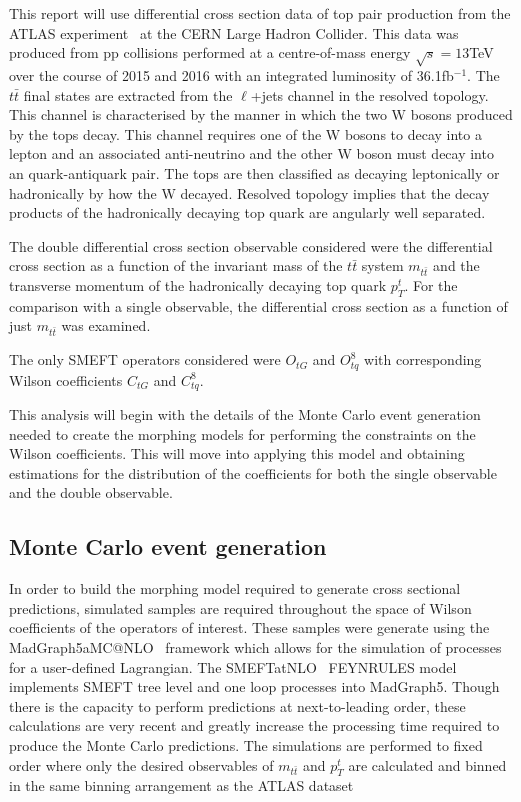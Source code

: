 \documentclass[a4paper]{article}
\begin{document}
This report will use differential cross section data of top pair production from the ATLAS experiment~\cite{ATLAS:2019hxz} at the CERN Large Hadron Collider.
This data was produced from pp collisions performed at a centre-of-mass energy $\sqrt{s} = 13$TeV over the course of 2015 and 2016 with an integrated luminosity of 36.1fb$^{-1}$.
The $t\bar{t}$ final states are extracted from the $\ell$+jets channel in the resolved topology.
This channel is characterised by the manner in which the two W bosons produced by the tops decay.
This channel requires one of the W bosons to decay into a lepton and an associated anti-neutrino and the other W boson must decay into an quark-antiquark pair.
The tops are then classified as decaying leptonically or hadronically by how the W decayed.
Resolved topology implies that the decay products of the hadronically decaying top quark are angularly well separated.

The double differential cross section observable considered  were the differential cross section as a function of the invariant mass of the $t\bar{t}$ system $m_{t\bar{t}}$ and the transverse momentum of the hadronically decaying top quark $p_{T}^{t}$.
For the comparison with a single observable, the differential cross section as a function of just $m_{t\bar{t}}$ was examined.

The only SMEFT operators considered were $O_{tG}$ and $O_{tq}^{8}$ with corresponding Wilson coefficients $C_{tG}$ and $C_{tq}^8$. 

This analysis will begin with the details of the Monte Carlo event generation needed to create the morphing models for performing the constraints on the Wilson coefficients.
This will move into applying this model and obtaining estimations for the distribution of the coefficients for both the single observable and the double observable.

\subsection{Monte Carlo event generation}
In order to build the morphing model required to generate cross sectional predictions, simulated samples are required throughout the space of Wilson coefficients of the operators of interest.
These samples were generate using the MadGraph5\textunderscore aMC@NLO~\cite{Alwall_2014} framework which allows for the simulation of processes for a user-defined Lagrangian.
The SMEFTatNLO~\cite{degrande2020automated} FEYNRULES model implements SMEFT tree level and one loop processes into MadGraph5.
Though there is the capacity to perform predictions at next-to-leading order, these calculations are very recent  and greatly increase the processing time required to produce the Monte Carlo predictions.
The simulations are performed to fixed order where only the desired observables of $m_{t\bar{t}}$ and ${p_{T}^{t}}$ are calculated and binned in the same binning arrangement as the ATLAS dataset
\end{document}
